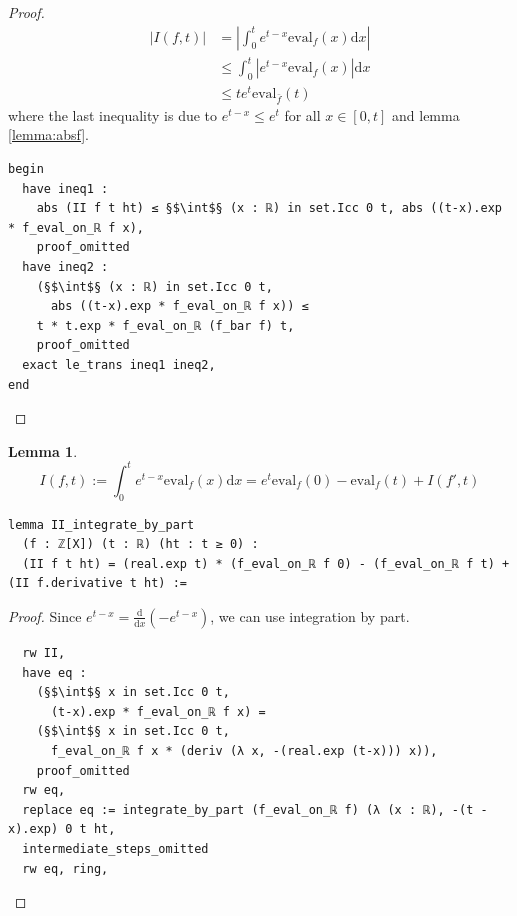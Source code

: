 \documentclass{report}
\theoremstyle{definition}
\newtheorem{lemma}{Lemma}[section]
\begin{document}
\begin{proof}
\begin{equation*}
\begin{aligned}
\left|I(f,t)\right|&=\left|\int_0^te^{t-x}\mathrm{eval}_f(x)\mathrm{d}x\right|\\
                   &\le \int_0^t\left|e^{t-x}\mathrm{eval}_f(x)\right|\mathrm{d}x\\
                   &\le t e^{t}\mathrm{eval}_{\bar f}(t)
\end{aligned}
\end{equation*}
where the last inequality is due to $e^{t-x}\le e^t$ for all $x\in[0,t]$ and lemma \ref{lemma:absf}.
\begin{verbatim}
begin
  have ineq1 :
    abs (II f t ht) ≤ §$\int$§ (x : ℝ) in set.Icc 0 t, abs ((t-x).exp * f_eval_on_ℝ f x),
    proof_omitted
  have ineq2 : 
    (§$\int$§ (x : ℝ) in set.Icc 0 t,
      abs ((t-x).exp * f_eval_on_ℝ f x)) ≤ 
    t * t.exp * f_eval_on_ℝ (f_bar f) t,
    proof_omitted
  exact le_trans ineq1 ineq2,
end
\end{verbatim}
\end{proof}

\begin{lemma}\label{lemma:byPartOnce}
$$
I(f,t):=\int_0^t e^{t-x}\mathrm{eval}_f(x)\mathrm{d}x=e^t\mathrm{eval}_f(0)-\mathrm{eval}_f(t)+I(f', t)
$$
\begin{verbatim}
lemma II_integrate_by_part 
  (f : ℤ[X]) (t : ℝ) (ht : t ≥ 0) : 
  (II f t ht) = (real.exp t) * (f_eval_on_ℝ f 0) - (f_eval_on_ℝ f t) + (II f.derivative t ht) :=
\end{verbatim}
\end{lemma}

\begin{proof}
Since $e^{t-x}=\frac{\mathrm d}{\mathrm d x}\left(-e^{t-x}\right)$, we can use integration by part.
\begin{verbatim}
  rw II,
  have eq : 
    (§$\int$§ x in set.Icc 0 t,
      (t-x).exp * f_eval_on_ℝ f x) = 
    (§$\int$§ x in set.Icc 0 t,
      f_eval_on_ℝ f x * (deriv (λ x, -(real.exp (t-x))) x)),
    proof_omitted
  rw eq,
  replace eq := integrate_by_part (f_eval_on_ℝ f) (λ (x : ℝ), -(t - x).exp) 0 t ht,
  intermediate_steps_omitted
  rw eq, ring,
\end{verbatim}
\end{proof}
\end{document}

